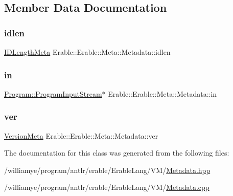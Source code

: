 \subsection{Member Data Documentation}
\mbox{\label{class_erable_1_1_erable_1_1_meta_1_1_metadata_a4cbb333222343f1b01dfff65b5a91b4c}} 
\subsubsection{\texorpdfstring{idlen}{idlen}}
{\footnotesize\ttfamily \mbox{\hyperlink{struct_erable_1_1_erable_1_1_meta_1_1_i_d_length_meta}{I\+D\+Length\+Meta}} Erable\+::\+Erable\+::\+Meta\+::\+Metadata\+::idlen\hspace{0.3cm}{\ttfamily [private]}}

\mbox{\label{class_erable_1_1_erable_1_1_meta_1_1_metadata_a8b9de1048f3739f22de3e00644ef5931}} 
\subsubsection{\texorpdfstring{in}{in}}
{\footnotesize\ttfamily \mbox{\hyperlink{class_erable_1_1_erable_1_1_program_1_1_program_input_stream}{Program\+::\+Program\+Input\+Stream}}$\ast$ Erable\+::\+Erable\+::\+Meta\+::\+Metadata\+::in\hspace{0.3cm}{\ttfamily [private]}}

\mbox{\label{class_erable_1_1_erable_1_1_meta_1_1_metadata_adbf922c4cac970605f38dae0c10c3f2e}} 
\subsubsection{\texorpdfstring{ver}{ver}}
{\footnotesize\ttfamily \mbox{\hyperlink{struct_erable_1_1_erable_1_1_meta_1_1_version_meta}{Version\+Meta}} Erable\+::\+Erable\+::\+Meta\+::\+Metadata\+::ver\hspace{0.3cm}{\ttfamily [private]}}



The documentation for this class was generated from the following files\+:\begin{DoxyCompactItemize}
\item 
/williamye/program/antlr/erable/\+Erable\+Lang/\+V\+M/\mbox{\hyperlink{_metadata_8hpp}{Metadata.\+hpp}}\item 
/williamye/program/antlr/erable/\+Erable\+Lang/\+V\+M/\mbox{\hyperlink{_metadata_8cpp}{Metadata.\+cpp}}\end{DoxyCompactItemize}
